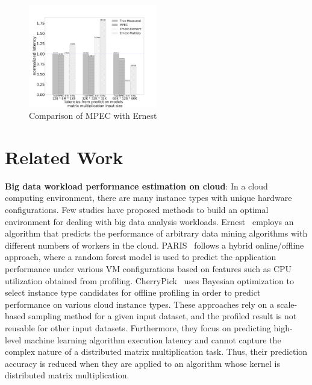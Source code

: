 \documentclass[10pt, conference, compsocconf]{IEEEtran}
\begin{document}
\begin{figure}[t]
	\centering\includegraphics[width=0.5\textwidth]{figures/MPC-Ernest-compare.pdf}\caption{Comparison of MPEC with Ernest}\label{fig:mpc-ernest}
\end{figure}

\section{Related Work}\label{sec:relatedwork}
\textbf{Big data workload performance estimation on cloud}: In a cloud computing environment, there are many instance types with unique hardware configurations. Few studies have proposed methods to build an optimal environment for dealing with big data analysis workloads. Ernest~\cite{ernest} employs an algorithm that predicts the performance of arbitrary data mining algorithms with different numbers of workers in the cloud. PARIS~\cite{paris} follows a hybrid online/offline approach, where a random forest model is used to predict the application performance under various VM configurations based on features such as CPU utilization obtained from profiling. CherryPick~\cite{cherrypick} uses Bayesian optimization to select instance type candidates for offline profiling in order to predict performance on various cloud instance types. These approaches rely on a scale-based sampling method for a given input dataset, and the profiled result is not reusable for other input datasets. Furthermore, they focus on predicting high-level machine learning algorithm execution latency and cannot capture the complex nature of a distributed matrix multiplication task. Thus, their prediction accuracy is reduced when they are applied to an algorithm whose kernel is distributed matrix multiplication.
\end{document}
